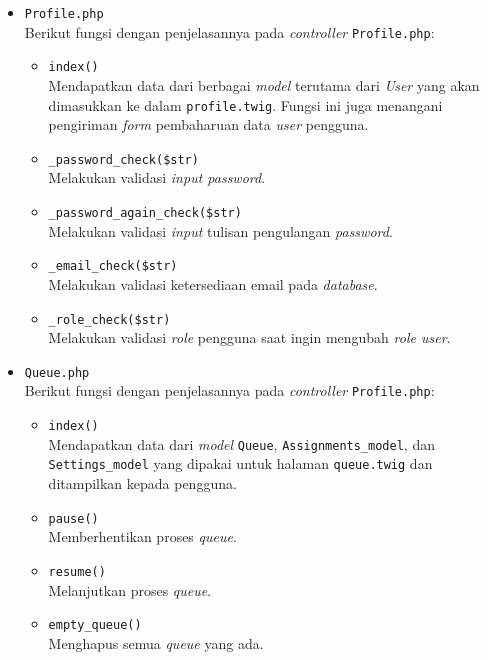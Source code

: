 \begin{itemize}
      \item \verb|Profile.php| \\
            Berikut fungsi dengan penjelasannya pada \textit{controller} \verb|Profile.php|:

            \begin{itemize}
                  \item \verb|index()| \\
                        Mendapatkan data dari berbagai \textit{model} terutama dari \textit{User} yang akan dimasukkan ke dalam \verb|profile.twig|. Fungsi ini juga menangani pengiriman \textit{form} pembaharuan data \textit{user} pengguna.
                  \item \verb|_password_check($str)| \\
                        Melakukan validasi \textit{input password}.
                  \item \verb|_password_again_check($str)| \\
                        Melakukan validasi \textit{input} tulisan pengulangan \textit{password}.
                  \item \verb|_email_check($str)| \\
                        Melakukan validasi ketersediaan email pada \textit{database}.
                  \item \verb|_role_check($str)| \\
                        Melakukan validasi \textit{role} pengguna saat ingin mengubah \textit{role user}.
            \end{itemize}

      \item \verb|Queue.php| \\
            Berikut fungsi dengan penjelasannya pada \textit{controller} \verb|Profile.php|:

            \begin{itemize}
                  \item \verb|index()| \\
                        Mendapatkan data dari \textit{model} \verb|Queue|, \verb|Assignments_model|, dan \verb|Settings_model| yang dipakai untuk halaman \verb|queue.twig| dan ditampilkan kepada pengguna.
                  \item \verb|pause()| \\
                        Memberhentikan proses \textit{queue}.
                  \item \verb|resume()| \\
                        Melanjutkan proses \textit{queue}.
                  \item \verb|empty_queue()| \\
                        Menghapus semua \textit{queue} yang ada.
            \end{itemize}


\end{itemize}
